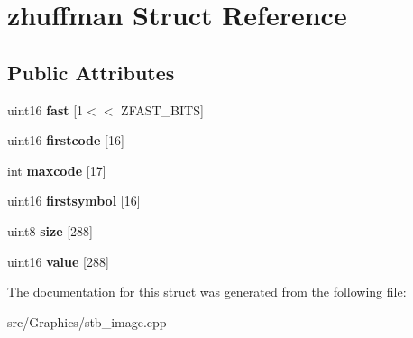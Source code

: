 \hypertarget{structzhuffman}{\section{zhuffman Struct Reference}
\label{structzhuffman}
}
\subsection*{Public Attributes}
\begin{DoxyCompactItemize}
\item 
\hypertarget{structzhuffman_a12d5f92a121b65680e5f0b4027d00c96}{uint16 {\bfseries fast} \mbox{[}1$<$$<$ Z\+F\+A\+S\+T\+\_\+\+B\+I\+T\+S\mbox{]}}\label{structzhuffman_a12d5f92a121b65680e5f0b4027d00c96}

\item 
\hypertarget{structzhuffman_a81f5ae5bd31b40439955de6154572917}{uint16 {\bfseries firstcode} \mbox{[}16\mbox{]}}\label{structzhuffman_a81f5ae5bd31b40439955de6154572917}

\item 
\hypertarget{structzhuffman_ac7dd4a2bf01a6e27933dd1cf6b0cc762}{int {\bfseries maxcode} \mbox{[}17\mbox{]}}\label{structzhuffman_ac7dd4a2bf01a6e27933dd1cf6b0cc762}

\item 
\hypertarget{structzhuffman_afbdb21fd99f413fc8f9e58243552fe95}{uint16 {\bfseries firstsymbol} \mbox{[}16\mbox{]}}\label{structzhuffman_afbdb21fd99f413fc8f9e58243552fe95}

\item 
\hypertarget{structzhuffman_a46ce4d4a4d7fc41c2560616f6696e9b9}{uint8 {\bfseries size} \mbox{[}288\mbox{]}}\label{structzhuffman_a46ce4d4a4d7fc41c2560616f6696e9b9}

\item 
\hypertarget{structzhuffman_acc395b638b700b944c329d71a8b82084}{uint16 {\bfseries value} \mbox{[}288\mbox{]}}\label{structzhuffman_acc395b638b700b944c329d71a8b82084}

\end{DoxyCompactItemize}


The documentation for this struct was generated from the following file\+:\begin{DoxyCompactItemize}
\item 
src/\+Graphics/stb\+\_\+image.\+cpp\end{DoxyCompactItemize}
